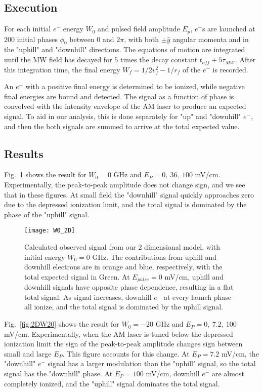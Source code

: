 \documentclass[aps,pra,preprint,groupedaddress]{revtex4-1}
\begin{document}
\subsection{\label{sec:exe} Execution}

For each initial $e^-$ energy $W_0$ and pulsed field amplitude $E_p$, $e^-$s are launched at 200 initial phases $\phi_0$ between 0 and $2\pi$, with both $\pm \hat{y}$ angular momenta and in the "uphill" and "downhill" directions. The equations of motion are integrated until the MW field has decayed for 5 times the decay constant $t_{off} + 5\tau_{MW}$. After this integration time, the final energy $W_f = 1/2 v_f^2 - 1/r_f$ of the $e^-$ is recorded.

An $e^-$ with a positive final energy is determined to be ionized, while negative final energies are bound and detected. The signal as a function of phase is convolved with the intensity envelope of the AM laser to produce an expected signal. To aid in our analysis, this is done separately for "up" and "downhill" $e^-$, and then the both signals are summed to arrive at the total expected value.

\subsection{\label{sec:res} Results}

Fig.~\ref{fig:2DW0} shows the result for $W_0 = 0$ GHz and $E_P = 0, ~36, ~100$ mV/cm. Experimentally, the peak-to-peak amplitude does not change sign, and we see that in these figures. At small field the "downhill" signal quickly approaches zero due to the depressed ionization limit, and the total signal is dominated by the phase of the "uphill" signal.

\begin{figure}
	\texttt{[image: W0\_2D]}
	\caption{Calculated observed signal from our 2 dimensional model, with initial energy $W_0 = 0$ GHz. The contributions from uphill and downhill electrons are in orange and blue, respectively, with the total expected signal in Green. At $E_{pulse} = 0$ mV/cm, uphill and downhill signals have opposite phase dependence, resulting in a flat total signal. As signal increases, downhill $e^-$ at every launch phase all ionize, and the total signal is dominated by the uphill signal.}
	\label{fig:2DW0}
\end{figure}

Fig.~\ref{fig:2DW20} shows the result for $W_0 = -20$ GHz and $E_P = 0, ~7.2, ~100$ mV/cm. Experimentally, when the AM laser is tuned below the depressed ionization limit the sign of the peak-to-peak amplitude changes sign between small and large $E_P$. This figure accounts for this change. At $E_P = 7.2$ mV/cm, the "downhill" $e^-$ signal has a larger modulation than the "uphill" signal, so the total signal has the "downhill" phase. At $E_P = 100$ mV/cm, downhill $e^-$ are almost completely ionized, and the "uphill" signal dominates the total signal.
\end{document}

